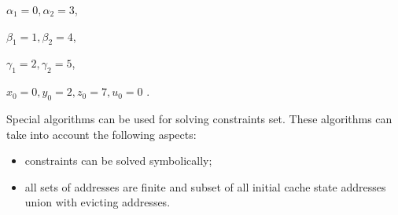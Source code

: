 $\alpha_1 = 0, \alpha_2 = 3$,

$\beta_1 = 1, \beta_2 = 4$,

$\gamma_1 = 2, \gamma_2 = 5$,

$x_0 = 0, y_0 = 2, z_0 = 7, u_0 = 0$ .

Special algorithms can be used for solving constraints set. These
algorithms can take into account the following aspects:
\begin{itemize}
\item constraints can be solved symbolically;
\item all sets of addresses are finite and subset of all initial
cache state addresses union with evicting addresses.
\end{itemize}
